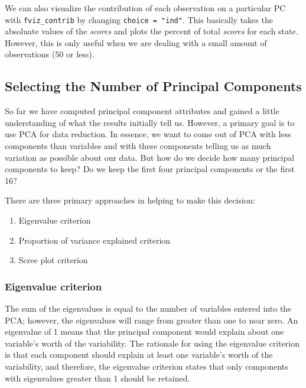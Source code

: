\documentclass[]{book}
\providecommand{\tightlist}{%
  \setlength{\itemsep}{0pt}\setlength{\parskip}{0pt}}
\theoremstyle{definition}
\theoremstyle{definition}
\theoremstyle{definition}
\theoremstyle{remark}
\let\BeginKnitrBlock\begin \let\EndKnitrBlock\end
\begin{document}
\BeginKnitrBlock{note}
We can also visualize the contribution of each observation on a
particular PC with \texttt{fviz\_contrib} by changing
\texttt{choice\ =\ "ind"}. This basically takes the absoluate values of
the \emph{scores} and plots the percent of total \emph{scores} for each
state. However, this is only useful when we are dealing with a small
amount of observations (50 or less).
\EndKnitrBlock{note}

\hypertarget{selecting-the-number-of-principal-components}{%
\subsection{Selecting the Number of Principal
Components}\label{selecting-the-number-of-principal-components}}

So far we have computed principal component attributes and gained a
little understanding of what the results initially tell us. However, a
primary goal is to use PCA for data reduction. In essence, we want to
come out of PCA with less components than variables and with these
components telling us as much variation as possible about our data. But
how do we decide how many principal components to keep? Do we keep the
first four principal components or the first 16?

There are three primary approaches in helping to make this decision:

\begin{enumerate}
\def\labelenumi{\arabic{enumi}.}
\tightlist
\item
  Eigenvalue criterion
\item
  Proportion of variance explained criterion
\item
  Scree plot criterion
\end{enumerate}

\hypertarget{eigenvalue-criterion}{%
\subsubsection{Eigenvalue criterion}\label{eigenvalue-criterion}}

The sum of the eigenvalues is equal to the number of variables entered
into the PCA; however, the eigenvalues will range from greater than one
to near zero. An eigenvalue of 1 means that the principal component
would explain about one variable's worth of the variability. The
rationale for using the eigenvalue criterion is that each component
should explain at least one variable's worth of the variability, and
therefore, the eigenvalue criterion states that only components with
eigenvalues greater than 1 should be retained.
\end{document}

